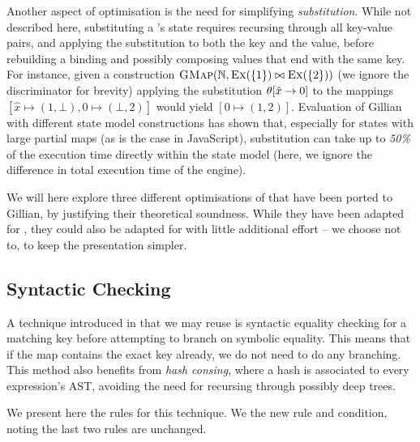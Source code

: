 Another aspect of optimisation is the need for simplifying \emph{substitution}. While not described here, substituting a \GMap's state requires recursing through all key-value pairs, and applying the substitution to both the key and the value, before rebuilding a binding and possibly composing values that end with the same key. For instance, given a construction $\textsc{GMap}(\mathbb N, \textsc{Ex}(\{1\}) \bowtie \textsc{Ex}(\{2\}))$ (we ignore the discriminator for brevity) applying the substitution $\theta[\hat x\rightarrow 0]$ to the mappings $[ \hat x \mapsto (1, \bot), 0 \mapsto (\bot, 2)]$ would yield $[0 \mapsto (1,2)]$. Evaluation of Gillian with different state model constructions has shown that, especially for states with large partial maps (as is the case in JavaScript), substitution can take up to \emph{50\%} of the execution time directly within the state model (here, we ignore the difference in total execution time of the engine). 

We will here explore three different optimisations of \PMap{} that have been ported to Gillian, by justifying their theoretical soundness. While they have been adapted for \PMap{}, they could also be adapted for \GMap{} with little additional effort -- we choose not to, to keep the presentation simpler.

\subsection{Syntactic Checking}

A technique introduced in \cite{sacha-phd} that we may reuse is syntactic equality checking for a matching key before attempting to branch on symbolic equality. This means that if the map contains the exact key already, we do not need to do any branching. This method also benefits from \emph{hash consing}, where a hash is associated to every expression's AST, avoiding the need for recursing through possibly deep trees. 

We present here the rules for this technique. We  the new rule and condition, noting the last two rules are unchanged.

